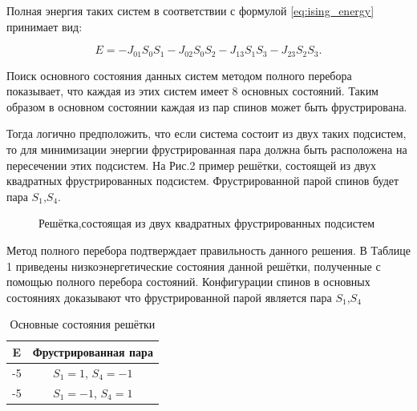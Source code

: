 \documentclass[utf8, babel, sor, jor, amsmath,amssymb, reprint]{elsarticle} %
\begin{document}
Полная энергия таких систем в соответствии с формулой \eqref{eq:ising_energy} принимает вид:

\begin{equation}
	E = -J_{01} S_0 S_1-J_{02} S_0 S_2-J_{13} S_1 S_3-J_{23} S_2 S_3.
	\label{eq:ising_energy_2x2}
\end{equation}

Поиск основного состояния данных систем методом полного перебора показывает, что каждая из этих систем имеет 8 основных состояний. Таким образом в основном состоянии каждая из пар спинов может быть фрустрирована.

Тогда логично предположить, что если система состоит из двух таких подсистем, то для минимизации энергии фрустрированная пара должна быть расположена на пересечении этих подсистем.
На Рис.2 пример решётки, состоящей из двух квадратных фрустрированных подсистем. Фрустрированной парой спинов будет пара $S_1$,$S_4$.

\begin{figure}[h]
	\centering
	\caption{Решётка,состоящая из двух квадратных фрустрированных подсистем}
	\label{fig:label}
\end{figure}


Метод полного перебора подтверждает правильность данного решения. В Таблице 1 приведены низкоэнергетические состояния данной решётки, полученные с помощью полного перебора состояний. Конфигурации спинов в основных состояниях доказывают что фрустрированной парой является пара $S_1$,$S_4$

\begin{table}[h]
	\centering
	\begin{tabular}{|c|c|}
		\hline
		 E   &   Фрустрированная пара \\
		 \hline
		-5   &  $S_1=1$, $S_4=-1$ \\
		\hline
		-5   &   $S_1=-1$, $S_4=1$ \\
		\hline
	\end{tabular}
	\caption{Основные состояния решётки}
	\label{tab:gs}
\end{table}
\end{document}
